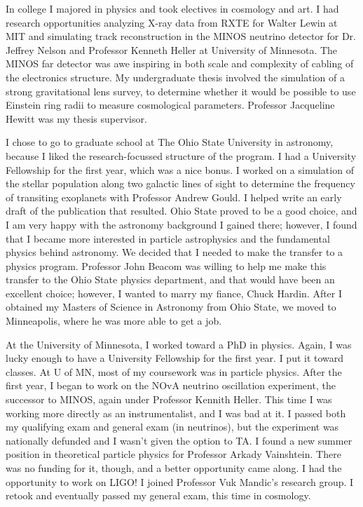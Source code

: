 \documentclass[12pt,letterpaper]{lsuetd}
\begin{document}
In college I majored in physics and took electives in cosmology and art. I had research opportunities analyzing X-ray data from RXTE for Walter Lewin at MIT and simulating track reconstruction in the MINOS neutrino detector for Dr. Jeffrey Nelson and Professor Kenneth Heller at University of Minnesota.  The MINOS far detector was awe inspiring in both scale and complexity of cabling of the electronics structure. My undergraduate thesis involved the simulation of a strong gravitational lens survey, to determine whether it would be possible to use Einstein ring radii to measure cosmological parameters. Professor Jacqueline Hewitt was my thesis supervisor.

I chose to go to graduate school at The Ohio State University in astronomy, because I liked the research-focussed structure of the program. I had a University Fellowship for the first year, which was a nice bonus. I worked on a simulation of the stellar population along two galactic lines of sight to determine the frequency of transiting exoplanets with Professor Andrew Gould. I helped write an early draft of the publication that resulted. Ohio State proved to be a good choice, and I am very happy with the astronomy background I gained there; however, I found that I became more interested in particle astrophysics and the fundamental physics behind astronomy. We decided that I needed to make the transfer to a physics program. Professor John Beacom was willing to help me make this transfer to the Ohio State physics department, and that would have been an excellent choice; however, I wanted to marry my fiance, Chuck Hardin. After I obtained my Masters of Science in Astronomy from Ohio State, we moved to Minneapolis, where he was more able to get a job.

At the University of Minnesota, I worked toward a PhD in physics. Again, I was lucky enough to have a University Fellowship for the first year. I put it toward classes. At U of MN, most of my coursework was in particle physics. After the first year, I began to work on the NOvA neutrino oscillation experiment, the successor to MINOS, again under Professor Kennith Heller. This time I was working more directly as an instrumentalist, and I was bad at it. I passed both my qualifying exam and general exam (in neutrinos), but the experiment was nationally defunded and I wasn't given the option to TA. I found a new summer position in theoretical particle physics for Professor Arkady Vainshtein. There was no funding for it, though, and a better opportunity came along. I had the opportunity to work on LIGO! I joined Professor Vuk Mandic's research group. I retook and eventually passed my general exam, this time in cosmology.
\end{document}
